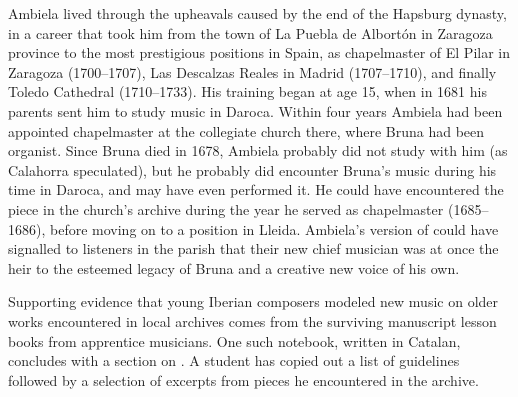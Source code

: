 Ambiela lived through the upheavals caused by the end of the Hapsburg dynasty,
in a career that took him from the town of La Puebla de Albortón in Zaragoza
province to the most prestigious positions in Spain, as chapelmaster of El
Pilar in Zaragoza (1700--1707), Las Descalzas Reales in Madrid (1707--1710),
and finally Toledo Cathedral (1710--1733).%
    \Autocites
    [1]{Calahorra:Suban}
    []{Grove}
    {Alvarez:Ambiela}
His training began at age 15, when in 1681 his parents sent him to study music
in Daroca.
Within four years Ambiela had been appointed chapelmaster at the collegiate
church there, where Bruna had been organist.
Since Bruna died in 1678, Ambiela probably did not study with him (as Calahorra
speculated), but he probably did encounter Bruna's music during his time in
Daroca, and may have even performed it.%
    \Autocite{Calahorra:Suban}
He could have encountered the piece in the church's archive during the year he
served as chapelmaster (1685--1686), before moving on to a position in Lleida.
Ambiela's version of  could have signalled to listeners
in the parish that their new chief musician was at once the heir to the
esteemed legacy of Bruna and a creative new voice of his own.


Supporting evidence that young Iberian composers modeled new music on older
works encountered in local archives comes from the surviving manuscript lesson
books from apprentice musicians.
One such notebook, written in Catalan, concludes with a section on .%
    \Autocite{Cpt-Notes-Girona}
A student has copied out a list of guidelines followed by a selection of
excerpts from pieces he encountered in the archive.


